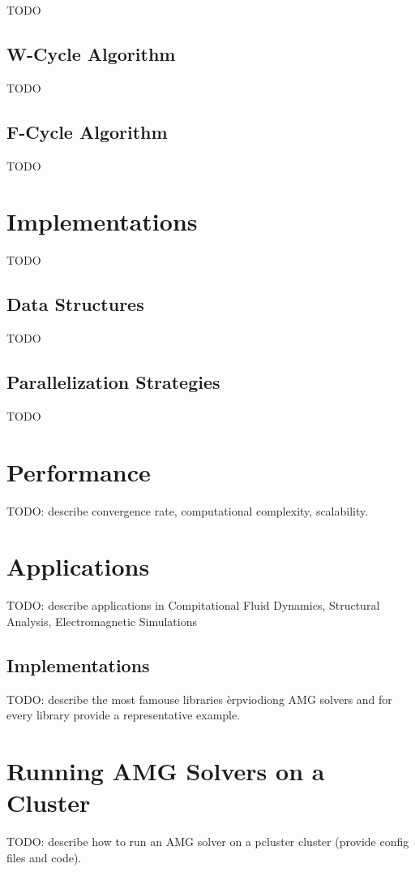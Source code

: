 TODO

\subsection{W-Cycle Algorithm}

TODO

\subsection{F-Cycle Algorithm}

TODO

\section{Implementations}

TODO

\subsection{Data Structures}

TODO

\subsection{Parallelization Strategies}

TODO

\section{Performance}

TODO: describe convergence rate, computational complexity, scalability.


\section{Applications}

TODO: describe applications in Compitational Fluid Dynamics, Structural Analysis, Electromagnetic Simulations

\subsection{Implementations}

TODO: describe the most famouse libraries èrpviodiong AMG solvers and for every library provide a representative example.

\section{Running AMG Solvers on a Cluster}

TODO: describe how to run an AMG solver on a pcluster cluster (provide config files and code).